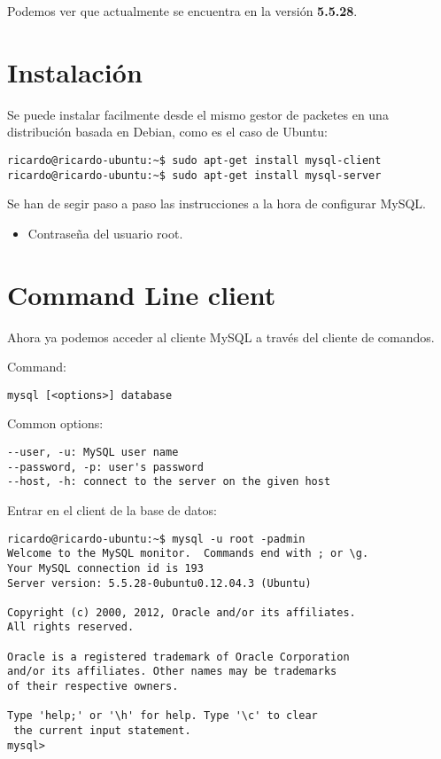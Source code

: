 \documentclass[11pt]{article}
\begin{document}
\par Podemos ver que actualmente se encuentra en la versión \textbf{5.5.28}.

\section{Instalaci\'on}

\par Se puede instalar facilmente desde el mismo gestor de packetes en una distribuci\'on basada en Debian, como es el caso de Ubuntu:

\begin{lstlisting}[style=Shell]
ricardo@ricardo-ubuntu:~$ sudo apt-get install mysql-client
ricardo@ricardo-ubuntu:~$ sudo apt-get install mysql-server
\end{lstlisting}

Se han de segir paso a paso las instrucciones a la hora de configurar MySQL.

\begin{itemize}
	\item Contrase\~na del usuario root.
\end{itemize}

\section{Command Line client}
\label{sec:cl-client}

\par Ahora ya podemos acceder al cliente MySQL a través del cliente de comandos.

\par Command:
\begin{lstlisting}[style=Shell]
mysql [<options>] database
\end{lstlisting}

\par Common options:
\begin{lstlisting}[style=Shell]
--user, -u: MySQL user name
--password, -p: user's password
--host, -h: connect to the server on the given host
\end{lstlisting}

\par Entrar en el client de la base de datos:
\begin{lstlisting}[style=Shell]
ricardo@ricardo-ubuntu:~$ mysql -u root -padmin
Welcome to the MySQL monitor.  Commands end with ; or \g.
Your MySQL connection id is 193
Server version: 5.5.28-0ubuntu0.12.04.3 (Ubuntu)

Copyright (c) 2000, 2012, Oracle and/or its affiliates. 
All rights reserved.

Oracle is a registered trademark of Oracle Corporation 
and/or its affiliates. Other names may be trademarks 
of their respective owners.

Type 'help;' or '\h' for help. Type '\c' to clear
 the current input statement.
mysql>
\end{lstlisting}
\end{document}
